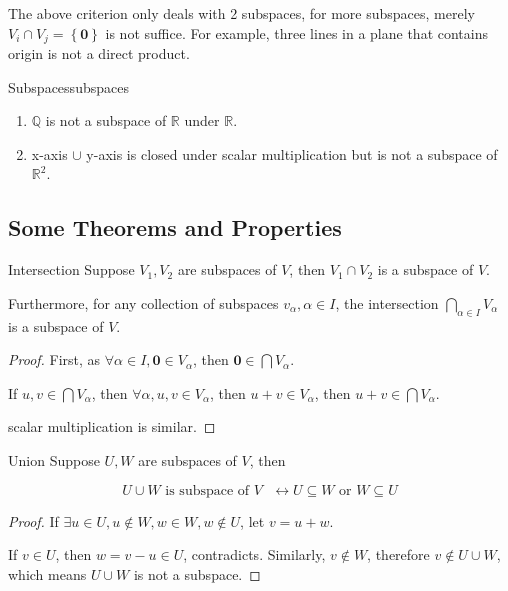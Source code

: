 \documentclass[../main.tex]{subfiles}
\begin{document}
\begin{remark}
The above criterion only deals with 2 subspaces, for more subspaces, merely $V_i\cap V_j = \left\{ \boldsymbol{0} \right\}$ is not suffice. For example, three lines in a plane that contains origin is not a direct product.
\end{remark}

\begin{example}{Subspaces}{subspaces}
\begin{enumerate}
	\item  $\mathbb{Q}$ is not a subspace of $\mathbb{R}$ under $\mathbb{R}$.
	\item x-axis  $\cup$ y-axis is closed under scalar multiplication but is not a subspace of $\mathbb{R}^2$.
\end{enumerate}
\end{example}

\subsection{Some Theorems and Properties}
\begin{theorem}{}{Intersection}
Suppose $V_1,V_2$ are subspaces of $V$, then $V_1\cap V_2$ is a subspace of $V$. 

Furthermore, for any collection of subspaces $v_{\alpha}, \alpha \in I$, the intersection $\displaystyle \bigcap_{\alpha \in I} V_{\alpha}$ is a subspace of $V$. 
\end{theorem}
\begin{proof}
First, as $\forall \alpha \in I, \boldsymbol{0}\in V_{\alpha}$, then $\boldsymbol{0}\in \bigcap V_{\alpha}$.

If $u,v \in \bigcap V_{\alpha}$, then $\forall \alpha, u,v \in V_{\alpha}$, then $u+v \in V_{\alpha}$, then $u+v \in \bigcap V_{\alpha}$.

scalar multiplication is similar.
\end{proof}

\begin{theorem}{}{Union}
Suppose $U,W$ are subspaces of $V$, then

\begin{equation*}
U\cup W \text{ is subspace of $V$ } \leftrightarrow U \subseteq W \text{ or } W \subseteq U
\end{equation*}
\end{theorem}
\begin{proof}
If $\exists u \in U, u \notin W, w \in W, w\notin U$, let $v = u+w$.

If  $v \in U$, then $w=v-u \in U$, contradicts. Similarly, $v \notin W$, therefore  $v \notin U\cup W$, which means $U\cup W$ is not a subspace.
\end{proof}
\end{document}
